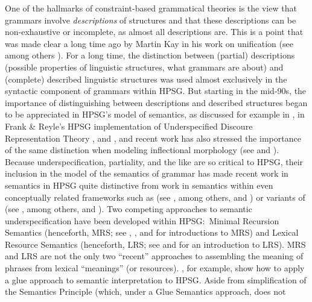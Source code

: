 \documentclass[output=paper
	        ,collection
	        ,collectionchapter
 	        ,biblatex
                ,babelshorthands
                ,newtxmath
                ,draftmode
                ,colorlinks, citecolor=brown
]{langscibook}
\begin{document}
One of the hallmarks of constraint-based grammatical theories is the view that grammars involve \emph{descriptions} of structures and that these descriptions can be non-exhaustive or incomplete, as almost all descriptions are.
This is a point that was made clear a long time ago by Martin Kay in his work on unification (see among others \citealt{Kay1979}). For a long time, the distinction between (partial) descriptions (possible properties of linguistic structures, what grammars are about) and (complete) described linguistic structures was used almost exclusively in the syntactic component of grammars within HPSG. But starting in the mid-90s, the importance of distinguishing between descriptions and described structures began to be appreciated in HPSG's model of semantics, as discussed for example in \citet{Nerbonne1993a}, in Frank \& Reyle's HPSG implementation of Underspecified Discoure Representation Theory \citep{FrankandReyle1992,FrankandReyle1995}, and \citet*{Copestakeetal1995}, and recent work has also stressed the importance of the same distinction when modeling inflectional morphology (see \citealt{CrysmannandBonami2016} and ). Because underspecification, partiality, and the like are so critical to HPSG, their inclusion in the model of the semantics of grammar has made recent work in semantics in HPSG quite distinctive from work in semantics within even conceptually related frameworks such as  (see \citealt{BK82a}, among others, and ) or variants of  (see \citealt{Steedman1996}, among others, and ). Two competing approaches to semantic underspecification have been developed within HPSG:\ Minimal Recursion Semantics (henceforth, MRS; see \citealt{Copestakeetal1995}, \citealt{Copestakeetal2001}, and \citealt{Copestakeetal2005} for introductions to MRS) and Lexical Resource Semantics (henceforth, LRS; see \citealt{RichterandSailer2004,RichterandSailer2001} and \citealt{IordachioaiaandRichter2015} for an introduction to LRS). MRS and LRS are not the only two ``recent'' approaches  to assembling the meaning of phrases from lexical ``meanings'' (or resources). \citet{AsudehandCrouch2002}, for example, show how to apply a glue approach to semantic interpretation to HPSG. Aside from simplification of the Semantics Principle (which, under a Glue Semantics approach, does not
\end{document}
